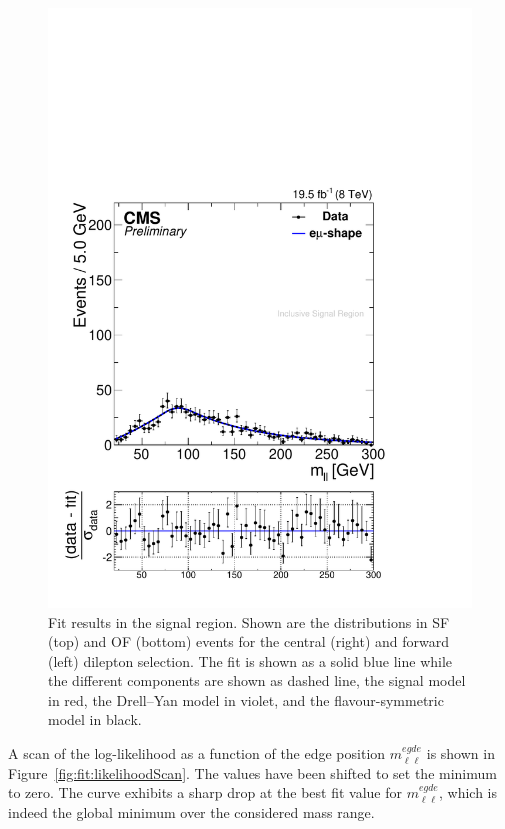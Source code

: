 \begin{figure}[!hbp]
\begin{minipage}[t]{0.49\textwidth}
    \includegraphics[width=\textwidth]{plots/results/fit/fit2012OFOS_ETHTriangle_SignalInclusive_Combined_Full2012_ETHTriangle_Forward.pdf}
  \end{minipage}
  \caption{Fit results in the signal region. Shown are the \mll distributions in SF (top) and OF (bottom) events for the central (right) and forward (left) dilepton selection. The fit is shown as a solid blue line while the different components are shown as dashed line, the signal model in red, the Drell--Yan model in violet, and the flavour-symmetric model in black.}
  \label{fig:fit:result}
\end{figure}



A scan of the log-likelihood as a function of the edge position $m_{\ell\ell}^{egde}$ is shown in Figure~\ref{fig:fit:likelihoodScan}. The values have been shifted to set the minimum to zero. The curve exhibits a sharp drop at the best fit value for $m_{\ell\ell}^{egde}$, which is indeed the global minimum over the considered mass range. 

